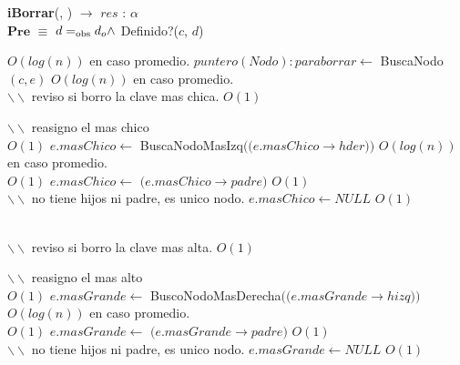\begin{algorithm}[H]{\textbf{iBorrar}(, ) $\to$ $res$ : $\alpha$}
	{\\ $\textbf{Pre}$ $\equiv$ $d =_{\mathrm{obs}} d_o \land$ Definido?($c$, $d$)}
	\begin{algorithmic}[1]

		 \Comment $O(log(n))$ en caso promedio.
			\State $puntero(Nodo): paraborrar \gets$ BuscaNodo$(c,e)$ \Comment $O(log(n))$ en caso promedio.
			\\

			\State $\backslash\backslash$ reviso si borro la clave mas chica.
			 \Comment $O(1)$

				\State $\backslash\backslash$ reasigno el mas chico
				\\

				 \Comment $O(1)$
					\State $e.masChico \gets$ BuscaNodoMasIzq$((e.masChico$$\rightarrow$$hder))$ \Comment $O(log(n))$ en caso promedio.
					\\

				 \Comment $O(1)$
					\State $e.masChico \gets$ $(e.masChico$$\rightarrow$$padre)$ \Comment $O(1)$
					\\

				\Else
					\State $\backslash\backslash$ no tiene hijos ni padre, es unico nodo.
					\State $e.masChico \gets NULL$ \Comment $O(1)$

				\EndIf

			\EndIf
			\\

			\State $\backslash\backslash$ reviso si borro la clave mas alta.
			 \Comment $O(1)$

				\State $\backslash\backslash$ reasigno el mas alto
				\\

				 \Comment $O(1)$
					\State $e.masGrande \gets$ BuscoNodoMasDerecha$((e.masGrande$$\rightarrow$$hizq))$ \Comment $O(log(n))$ en caso promedio.
					\\

				 \Comment $O(1)$
					\State $e.masGrande \gets$ $(e.masGrande$$\rightarrow$$padre)$ \Comment $O(1)$
					\\

				\Else
					\State $\backslash\backslash$ no tiene hijos ni padre, es unico nodo.
					\State $e.masGrande \gets NULL$ \Comment $O(1)$


\end{algorithmic}
\end{algorithm}
